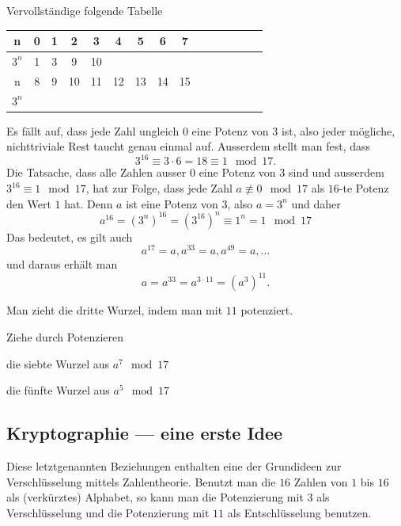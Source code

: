 \documentclass[%
11pt,%
twoside,%
titlepage,%
german,%
headsepline%
]{scrartcl}
\begin{document}
\begin{ueb}
Vervollständige folgende Tabelle\\

\begin{center}
\Large
\begin{tabular}{|c|c|c|c|c|c|c|c|c|c|c|c|c|c|c|}
\hline
n & 0 & 1 & 2&3&4&5&6&7\\
\hline
$3^n$&1&3&9&10& & & & \\
\hline\hline
n&8&9&10&11&12&13&14&15\\
\hline
$3^n$& & & & & & & &\\
\hline
\end{tabular}
\end{center}
\normalsize
\end{ueb}

\noindent Es fällt auf, dass jede Zahl ungleich $0$ eine Potenz von $3$ ist, also jeder mögliche, nichttriviale Rest taucht genau einmal auf. Ausserdem stellt man fest, dass
$$3^{16}\equiv3\cdot6=18\equiv1\mod17.$$
Die Tatsache, dass alle Zahlen ausser $0$ eine Potenz von $3$ sind und ausserdem $3^{16}\equiv1\mod17$, hat zur Folge, dass jede Zahl $a\not\equiv0\mod17$ als $16$-te Potenz den Wert $1$ hat. Denn $a$ ist eine Potenz von $3$, also $a=3^n$ und daher
$$a^{16}=(3^n)^{16}=(3^{16})^n\equiv1^n=1\mod17$$
Das bedeutet, es gilt auch
$$a^{17}=a, a^{33}=a, a^{49}=a, \dots$$
und daraus erhält man
$$a=a^{33}=a^{3\cdot11}=(a^3)^{11}.$$

\begin{bem}
Man zieht die dritte Wurzel, indem man mit $11$ potenziert.
\end{bem}

\begin{ueb}[Wurzeln]
Ziehe durch Potenzieren
\begin{enumeratea}
\item die siebte Wurzel aus $a^7\mod17$
\item die fünfte Wurzel aus $a^5\mod17$
\end{enumeratea}
\end{ueb}

\subsection{Kryptographie --- eine erste Idee}

Diese letztgenannten Beziehungen enthalten eine der Grundideen zur Verschlüsselung mittels Zahlentheorie. Benutzt man die $16$ Zahlen von $1$ bis $16$ als (verkürztes) Alphabet, so kann man die Potenzierung mit $3$ als Verschlüsselung und die Potenzierung mit $11$ als Entschlüsselung benutzen.
\end{document}
